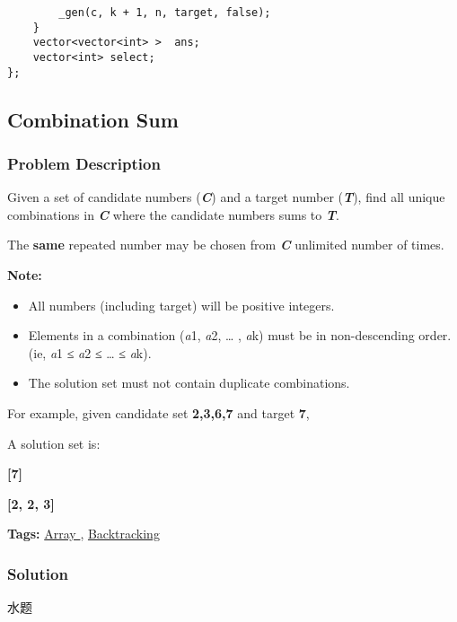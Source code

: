 \documentclass{article}
\begin{document}
\begin{CJK*}{UTF8}{gkai}
\begin{lstlisting}
        _gen(c, k + 1, n, target, false);
    }
    vector<vector<int> >  ans;
    vector<int> select;
}; 
\end{lstlisting}


\subsection{ Combination Sum }
\label{ Combination Sum }

\subsubsection*{Problem Description}
Given a set of candidate numbers (\textbf{\emph{C}}) and a target number (\textbf{\emph{T}}), find all unique combinations in \textbf{\emph{C}} where the candidate numbers sums to \textbf{\emph{T}}.

The \textbf{same} repeated number may be chosen from \textbf{\emph{C}} unlimited number of times.

\textbf{Note:}



\begin{itemize}
\item All numbers (including target) will be positive integers.
\item Elements in a combination (\emph{a}1, \emph{a}2, … , \emph{a}k) must be in non-descending order. (ie, \emph{a}1 ≤ \emph{a}2 ≤ … ≤ \emph{a}k).
\item The solution set must not contain duplicate combinations.
\end{itemize}

For example, given candidate set \textbf{2,3,6,7} and target \textbf{7}, 


A solution set is: 


\textbf{[7]} 


\textbf{[2, 2, 3]}


\textbf{Tags: }
\hyperref[ Array ]{ Array },  \hyperref[ Backtracking ]{ Backtracking }



\subsubsection*{Solution}
水题


\end{CJK*}
\end{document}
